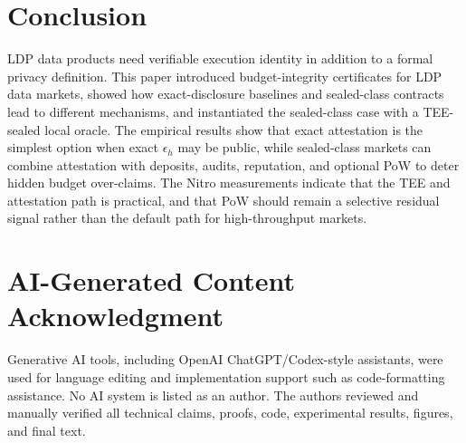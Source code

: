\documentclass[conference]{IEEEtran}
\newcommand{\eps}{\epsilon}
\begin{document}
\section{Conclusion}

LDP data products need verifiable execution identity in addition to a formal privacy definition. This paper introduced budget-integrity certificates for LDP data markets, showed how exact-disclosure baselines and sealed-class contracts lead to different mechanisms, and instantiated the sealed-class case with a TEE-sealed local oracle. The empirical results show that exact attestation is the simplest option when exact $\eps_h$ may be public, while sealed-class markets can combine attestation with deposits, audits, reputation, and optional PoW to deter hidden budget over-claims. The Nitro measurements indicate that the TEE and attestation path is practical, and that PoW should remain a selective residual signal rather than the default path for high-throughput markets.

\section*{AI-Generated Content Acknowledgment}
Generative AI tools, including OpenAI ChatGPT/Codex-style assistants, were used for language editing and implementation support such as code-formatting assistance. No AI system is listed as an author. The authors reviewed and manually verified all technical claims, proofs, code, experimental results, figures, and final text.
\end{document}

